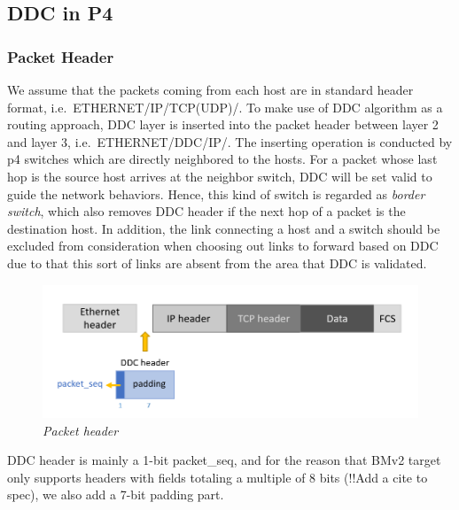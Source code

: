 \subsection{DDC in P4}
\label{sec:DDC}
\subsubsection{Packet Header}
We assume that the packets coming from each host are in standard header format, i.e.~ETHERNET/IP/TCP(UDP)/. To make use of DDC algorithm as a routing approach, DDC layer is inserted into the packet header between layer 2 and layer 3, i.e.~ETHERNET/DDC/IP/. The inserting operation is conducted by p4 switches which are directly neighbored to the hosts. For a packet whose last hop is the source host arrives at the neighbor switch, DDC will be set valid to guide the network behaviors. Hence, this kind of switch is regarded as \textit{border switch}, which also removes DDC header if the next hop of a packet is the destination host. In addition, the link connecting a host and a switch should be excluded from consideration when choosing out links to forward based on DDC due to that this sort of links are absent from the area that DDC is validated.

\begin{figure}[H]
      \centering \includegraphics[scale=0.55]{pictures/packet header.png}
      \caption{\it{Packet header}}
\end{figure}

DDC header is mainly a 1-bit packet\_seq, and for the reason that BMv2 target only supports headers with fields totaling a multiple of 8 bits (!!Add a cite to spec), we also add a 7-bit padding part.    

